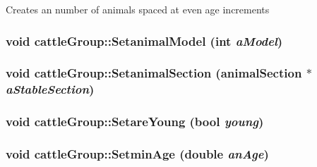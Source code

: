 \label{classcattle_group_a0f7c6c00ebef0008d2206dde4b2430db}
Creates an number of animals spaced at even age increments \hypertarget{classcattle_group_a17c74ae8a19301ebad46f82c82d4e188}{
\subsubsection[{SetanimalModel}]{\setlength{\rightskip}{0pt plus 5cm}void cattleGroup::SetanimalModel (int {\em aModel})}}
\label{classcattle_group_a17c74ae8a19301ebad46f82c82d4e188}
\hypertarget{classcattle_group_aae729884313654275cbc05971e104637}{
\subsubsection[{SetanimalSection}]{\setlength{\rightskip}{0pt plus 5cm}void cattleGroup::SetanimalSection ({\bf animalSection} $\ast$ {\em aStableSection})}}
\label{classcattle_group_aae729884313654275cbc05971e104637}
\hypertarget{classcattle_group_a8a49f4292ec8181467cdc9a1155d6782}{
\subsubsection[{SetareYoung}]{\setlength{\rightskip}{0pt plus 5cm}void cattleGroup::SetareYoung (bool {\em young})}}
\label{classcattle_group_a8a49f4292ec8181467cdc9a1155d6782}
\hypertarget{classcattle_group_ad530749d37d2e4c8af575699c79adb65}{
\subsubsection[{SetminAge}]{\setlength{\rightskip}{0pt plus 5cm}void cattleGroup::SetminAge (double {\em anAge})}}
\label{classcattle_group_ad530749d37d2e4c8af575699c79adb65}
